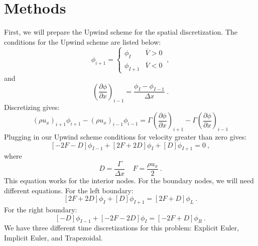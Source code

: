 \documentclass[12pt]{article}
\begin{document}
\section{Methods}
First, we will prepare the Upwind scheme for the spatial discretization. The conditions for the Upwind scheme are listed below:
\begin{equation*}
    \phi_{i+1} = \begin{cases}
                    \phi_{I} & \overline{V} > 0\\
                    \phi_{I+1} & \overline{V} < 0
                 \end{cases}\:,
\end{equation*}
and
\begin{equation}
    \left(\frac{\partial \phi}{\partial x}\right)_{i-1} = \frac{\phi_{I} - \phi_{I-1}}{\Delta x}\:.
\end{equation}
Discretizing gives:
\begin{equation*}
    \left( \rho u_x \right)_{i+1} \phi_{i+1} - \left( \rho u_x \right)_{i-1} \phi_{i-1} = \Gamma \left( \frac{\partial \phi}{\partial x} \right)_{i+1} - \Gamma \left( \frac{\partial \phi}{\partial x} \right)_{i-1}
\end{equation*}
Plugging in our Upwind scheme conditions for velocity greater than zero gives:
\begin{equation*}
    \left[-2F - D  \right] \phi_{I-1} + \left[ 2F + 2D \right] \phi_{I} + \left[ D \right] \phi_{I+1} = 0\:,
\end{equation*}
where
\begin{equation*}
    D = \frac{\Gamma}{\Delta x} ~~~~~ F = \frac{\rho u_x}{2}\:.
\end{equation*}
This equation works for the interior nodes. For the boundary nodes, we will need different equations. For the left boundary:
\begin{equation*}
    \left[ 2F + 2D \right] \phi_{I} + \left[ D \right] \phi_{I+1} = \left[ 2F + D \right] \phi_{L}\:.
\end{equation*}
For the right boundary:
\begin{equation*}
    \left[ -D \right] \phi_{I-1} + \left[ -2F - 2D \right] \phi_{I} = \left[ -2F + D \right] \phi_{R}\:.
\end{equation*}
We have three different time discretizations for this problem: Explicit Euler, Implicit Euler, and Trapezoidal.
\end{document}
